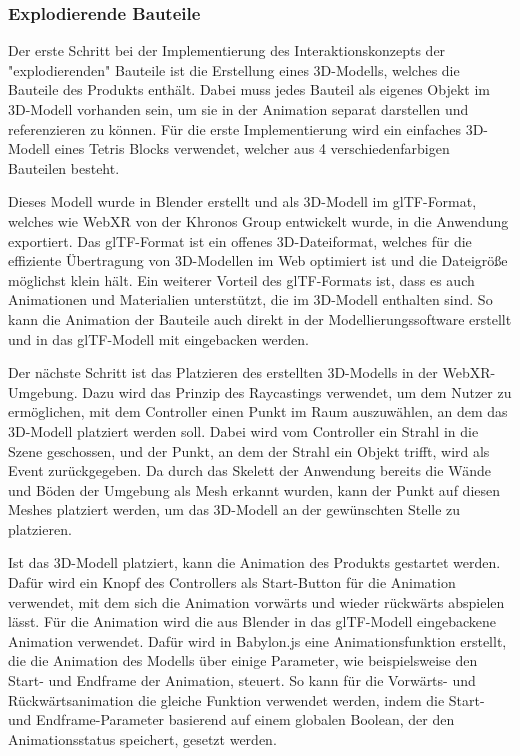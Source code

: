 \subsubsection{Explodierende Bauteile}

Der erste Schritt bei der Implementierung des Interaktionskonzepts der "explodierenden" Bauteile ist die Erstellung eines 3D-Modells, welches die Bauteile des Produkts enthält.
Dabei muss jedes Bauteil als eigenes Objekt im 3D-Modell vorhanden sein, um sie in der Animation separat darstellen und referenzieren zu können.
Für die erste Implementierung wird ein einfaches 3D-Modell eines Tetris Blocks verwendet, welcher aus 4 verschiedenfarbigen Bauteilen besteht.

Dieses Modell wurde in Blender erstellt und als 3D-Modell im glTF-Format, welches wie WebXR von der Khronos Group entwickelt wurde, in die Anwendung exportiert.
Das glTF-Format ist ein offenes 3D-Dateiformat, welches für die effiziente Übertragung von 3D-Modellen im Web optimiert ist und die Dateigröße möglichst klein hält.
Ein weiterer Vorteil des glTF-Formats ist, dass es auch Animationen und Materialien unterstützt, die im 3D-Modell enthalten sind.
So kann die Animation der Bauteile auch direkt in der Modellierungssoftware erstellt und in das glTF-Modell mit eingebacken werden.

Der nächste Schritt ist das Platzieren des erstellten 3D-Modells in der WebXR-Umgebung.
Dazu wird das Prinzip des Raycastings verwendet, um dem Nutzer zu ermöglichen, mit dem Controller einen Punkt im Raum auszuwählen, an dem das 3D-Modell platziert werden soll.
Dabei wird vom Controller ein Strahl in die Szene geschossen, und der Punkt, an dem der Strahl ein Objekt trifft, wird als Event zurückgegeben.
Da durch das Skelett der Anwendung bereits die Wände und Böden der Umgebung als Mesh erkannt wurden, kann der Punkt auf diesen Meshes platziert werden, um das 3D-Modell an der gewünschten Stelle zu platzieren.

Ist das 3D-Modell platziert, kann die Animation des Produkts gestartet werden.
Dafür wird ein Knopf des Controllers als Start-Button für die Animation verwendet, mit dem sich die Animation vorwärts und wieder rückwärts abspielen lässt.
Für die Animation wird die aus Blender in das glTF-Modell eingebackene Animation verwendet.
Dafür wird in Babylon.js eine Animationsfunktion erstellt, die die Animation des Modells über einige Parameter, wie beispielsweise den Start- und Endframe der Animation, steuert.
So kann für die Vorwärts- und Rückwärtsanimation die gleiche Funktion verwendet werden, indem die Start- und Endframe-Parameter basierend auf einem globalen Boolean, der den Animationsstatus speichert, gesetzt werden.

